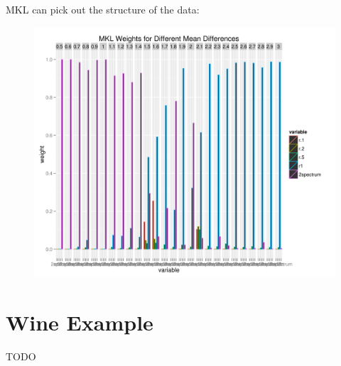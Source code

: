 MKL can pick out the structure of the data:
\begin{figure}[!ht]
  \centering
      \includegraphics[scale=.5]{MKL1.png}
\end{figure}

\section{Wine Example}
TODO
